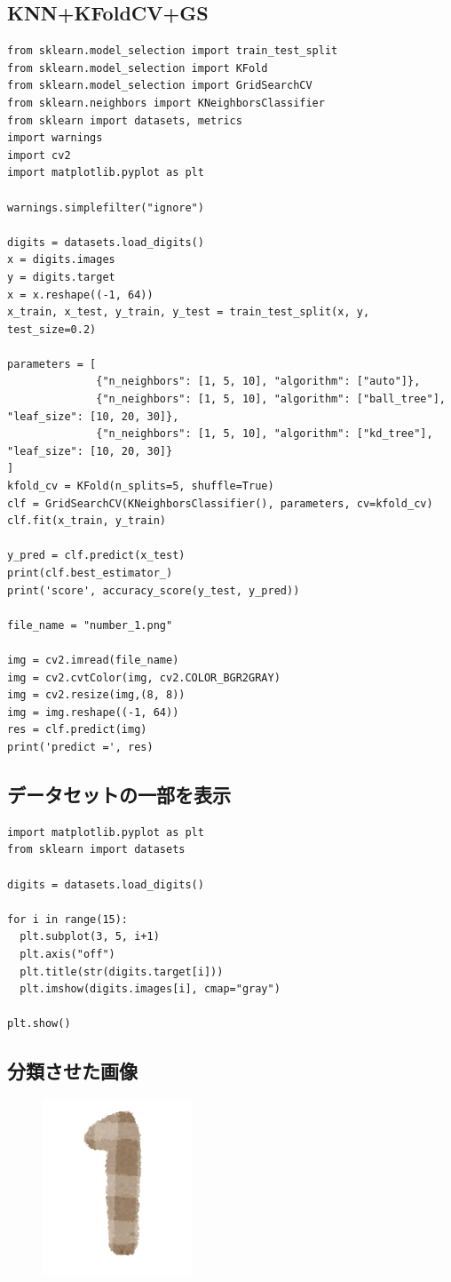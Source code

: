 \documentclass[a4paper, titlepage]{jsarticle}
\begin{document}
	\subsection{KNN+KFoldCV+GS}
	\begin{lstlisting}
from sklearn.model_selection import train_test_split
from sklearn.model_selection import KFold
from sklearn.model_selection import GridSearchCV
from sklearn.neighbors import KNeighborsClassifier
from sklearn import datasets, metrics
import warnings
import cv2
import matplotlib.pyplot as plt

warnings.simplefilter("ignore")

digits = datasets.load_digits()
x = digits.images
y = digits.target
x = x.reshape((-1, 64))
x_train, x_test, y_train, y_test = train_test_split(x, y, test_size=0.2)

parameters = [
              {"n_neighbors": [1, 5, 10], "algorithm": ["auto"]},
              {"n_neighbors": [1, 5, 10], "algorithm": ["ball_tree"], "leaf_size": [10, 20, 30]},
              {"n_neighbors": [1, 5, 10], "algorithm": ["kd_tree"], "leaf_size": [10, 20, 30]}
]
kfold_cv = KFold(n_splits=5, shuffle=True)
clf = GridSearchCV(KNeighborsClassifier(), parameters, cv=kfold_cv)
clf.fit(x_train, y_train)

y_pred = clf.predict(x_test)
print(clf.best_estimator_)
print('score', accuracy_score(y_test, y_pred))

file_name = "number_1.png"

img = cv2.imread(file_name)
img = cv2.cvtColor(img, cv2.COLOR_BGR2GRAY)
img = cv2.resize(img,(8, 8))
img = img.reshape((-1, 64))
res = clf.predict(img)
print('predict =', res)
	\end{lstlisting}

	\subsection{データセットの一部を表示}
	\begin{lstlisting}
import matplotlib.pyplot as plt
from sklearn import datasets

digits = datasets.load_digits()

for i in range(15):
  plt.subplot(3, 5, i+1)
  plt.axis("off")
  plt.title(str(digits.target[i]))
  plt.imshow(digits.images[i], cmap="gray")

plt.show()
	\end{lstlisting}

	\subsection{分類させた画像}
		\begin{figure}[ht]
			\centering
			\includegraphics[keepaspectratio, scale=0.4]{number_1.png}
		\end{figure}
\end{document}
